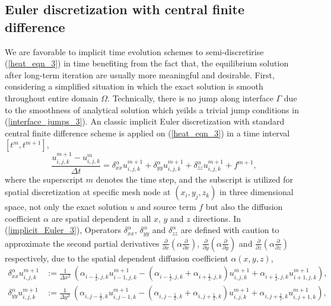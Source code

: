 \documentclass[dissertation]{uathesis}
\begin{document}
\begin{body}
\begin{flushleft}
\subsection{Euler discretization with central finite difference}
\hspace{1cm} We are favorable to implicit time evolution schemes to semi-discretirise (\ref{heat_eqn_3}) in time benefiting from the fact that, the equilibrium solution after long-term iteration are usually more meaningful and desirable. First, considering a simplified situation in which the exact solution is smooth throughout entire domain $\Omega$. Technically, there is no jump along interface $\Gamma$ due to the smoothness of analytical solution which yeilds a trivial jump conditions in (\ref{interface_jumps_3}). An classic implicit Euler discretization with standard central finite difference scheme is applied on (\ref{heat_eqn_3}) in a time interval $[t^{m}, t^{m+1}]$,
%
\begin{equation} \label{implicit_Euler_3}
\frac{u^{m+1}_{i,j,k}-u^{m}_{i,j,k}}{\Delta t} = 
\delta_{xx}^{\alpha} u^{m+1}_{i,j,k} + 
\delta_{yy}^{\alpha} u^{m+1}_{i,j,k} + 
\delta_{zz}^{\alpha} u^{m+1}_{i,j,k} + f^{m+1}, 
\end{equation}
%
where the superscript $m$ denotes the time step, and the subscript is utilized for spatial discretization at specific mesh node at $(x_i, y_j, z_k)$ in three dimensional space, not only the exact solution $u$ and source term $f$ but also the diffusion coefficient $\alpha$ are spatial dependent in all $x$, $y$ and $z$ directions. In (\ref{implicit_Euler_3}), Operators $\delta_{xx}^{\alpha}$, $\delta_{yy}^{\alpha}$ and $\delta_{zz}^{\alpha}$ are defined with caution to approximate the second partial derivatives $\frac{\partial}{\partial x}(\alpha \frac{\partial} {\partial x})$, $\frac{\partial}{\partial y}(\alpha \frac{\partial} {\partial y})$ and $\frac{\partial}{\partial z}(\alpha \frac{\partial} {\partial z})$ respectively, due to the spatial dependent diffusion coefficient $\alpha(x,y,z)$,
%
\begin{eqnarray} \label{delta_xx_3}
\delta_{xx}^{\alpha} u^{m+1}_{i,j,k} &:=  
\frac{1}{\Delta x^{2}} ~ (\alpha_{i-\frac{1}{2},j,k} u^{m+1}_{i-1,j,k} - (\alpha_{i-\frac{1}{2},j,k} + \alpha_{i+\frac{1}{2},j,k}) u^{m+1}_{i,j,k} + \alpha_{i+\frac{1}{2},j,k} u^{m+1}_{i+1,j,k}), \nonumber \\
\delta_{yy}^{\alpha} u^{m+1}_{i,j,k} &:= 
\frac{1}{\Delta y^{2}} ~ (\alpha_{i,j-\frac{1}{2},k} u^{m+1}_{i,j-1,k} - (\alpha_{i,j-\frac{1}{2},k} + \alpha_{i,j+\frac{1}{2},k}) u^{m+1}_{i,j,k} + \alpha_{i,j+\frac{1}{2},k} u^{m+1}_{i,j+1,k}), \\

\end{eqnarray}
\end{flushleft}
\end{body}
\end{document}
